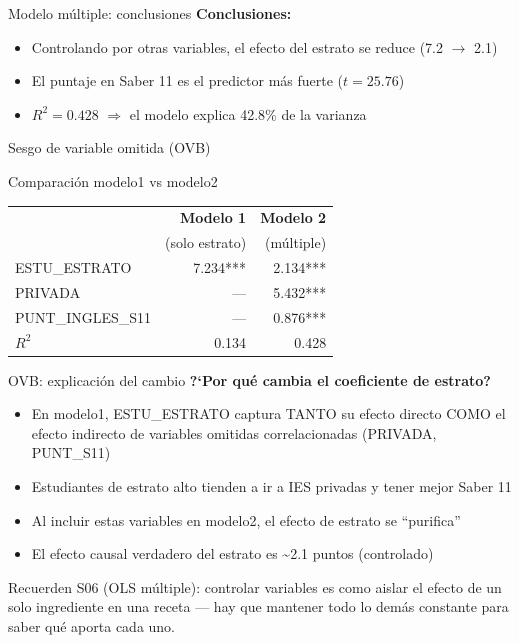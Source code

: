 \documentclass[aspectratio=169, 11pt]{beamer}
\begin{document}
\begin{frame}{Modelo múltiple: conclusiones}
\textbf{Conclusiones:}
\begin{itemize}
\item Controlando por otras variables, el efecto del estrato se reduce (7.2 $\to$ 2.1)
\item El puntaje en Saber 11 es el predictor más fuerte ($t = 25.76$)
\item $R^2 = 0.428$ $\Rightarrow$ el modelo explica 42.8\% de la varianza
\end{itemize}
\end{frame}

\begin{frame}{Sesgo de variable omitida (OVB)}
\begin{block}{Comparación modelo1 vs modelo2}
\renewcommand{\arraystretch}{1.2}
\begin{tabular}{lrr}
\toprule
 & \textbf{Modelo 1} & \textbf{Modelo 2} \\
 & (solo estrato) & (múltiple) \\
\midrule
ESTU\_ESTRATO & 7.234*** & 2.134*** \\
PRIVADA & — & 5.432*** \\
PUNT\_INGLES\_S11 & — & 0.876*** \\
\midrule
$R^2$ & 0.134 & 0.428 \\
\bottomrule
\end{tabular}
\end{block}
\end{frame}

\begin{frame}{OVB: explicación del cambio}
\textbf{?`Por qu\'e cambia el coeficiente de estrato?}
\begin{itemize}\setlength{\itemsep}{2pt}
\item En modelo1, ESTU\_ESTRATO captura TANTO su efecto directo COMO el efecto indirecto de variables omitidas correlacionadas (PRIVADA, PUNT\_S11)
\item Estudiantes de estrato alto tienden a ir a IES privadas y tener mejor Saber 11
\item Al incluir estas variables en modelo2, el efecto de estrato se ``purifica''
\item El efecto causal verdadero del estrato es \textasciitilde{}2.1 puntos (controlado)
\end{itemize}

\small
Recuerden S06 (OLS m\'ultiple): controlar variables es como aislar el efecto de un solo ingrediente en una receta --- hay que mantener todo lo dem\'as constante para saber qu\'e aporta cada uno.
\end{frame}
\end{document}
